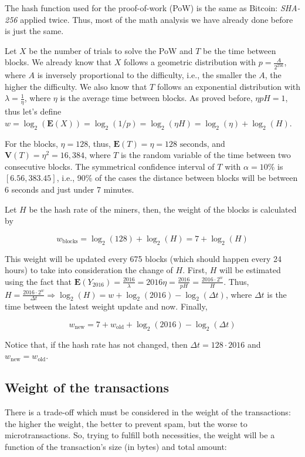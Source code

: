 The hash function used for the proof-of-work (PoW) is the same as Bitcoin: \emph{SHA-256} applied twice. Thus, most of the math analysis we have already done before is just the same.

Let $X$ be the number of trials to solve the PoW and $T$ be the time between blocks. We already know that $X$ follows a geometric distribution with $p = \frac{A}{2^{256}}$, where $A$ is inversely proportional to the difficulty, i.e., the smaller the $A$, the higher the difficulty. We also know that $T$ follows an exponential distribution with $\lambda = \frac{1}{\eta}$, where $\eta$ is the average time between blocks. As proved before, $\eta p H = 1$, thus let's define $w = \log_2(\mathbf{E}(X)) = \log_2(1/p) = \log_2(\eta H) = \log_2(\eta) + \log_2(H)$.

For the blocks, $\eta = 128$, thus, $\mathbf{E}(T) = \eta = 128 \text{ seconds}$, and $\mathbf{V}(T) = \eta^2 = 16,384$, where $T$ is the random variable of the time between two consecutive blocks. The symmetrical confidence interval of $T$ with $\alpha = 10\%$ is $[6.56, 383.45]$, i.e., 90\% of the cases the distance between blocks will be between 6 seconds and just under 7 minutes.

Let $H$ be the hash rate of the miners, then, the weight of the blocks is calculated by

$$w_\text{blocks} = \log_2(128) + \log_2(H) = 7 + \log_2(H)$$

This weight will be updated every 675 blocks (which should happen every 24 hours) to take into consideration the change of $H$. First, $H$ will be estimated using the fact that $\mathbf{E}(Y_{2016}) = \frac{2016}{\lambda} = 2016 \eta = \frac{2016}{pH} = \frac{2016 \cdot 2^w}{H}$. Thus, $H = \frac{2016 \cdot 2^w}{\Delta t} \Rightarrow \log_2(H) = w + \log_2(2016) - \log_2(\Delta t)$, where $\Delta t$ is the time between the latest weight update and now. Finally,

$$w_\text{new} = 7 + w_\text{old} + \log_2(2016) - \log_2(\Delta t)$$

Notice that, if the hash rate has not changed, then $\Delta t = 128 \cdot 2016$ and $w_\text{new} = w_\text{old}$.


\subsection{Weight of the transactions}

There is a trade-off which must be considered in the weight of the transactions: the higher the weight, the better to prevent spam, but the worse to microtransactions. So, trying to fulfill both necessities, the weight will be a function of the transaction's size (in bytes) and total amount:

